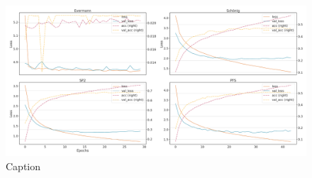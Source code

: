 \begin{figure}[!htb]
    \centering
    \includegraphics[width=\textwidth]{gfx/bpic2015_5/windowed_loss_acc_curve.png}
    \caption{Caption}
    \label{fig:my_label}
\end{figure}
\FloatBarrier